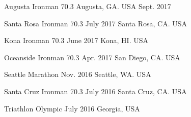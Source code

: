 

\begin{ironmans}

  \cvhonor
    {Augusta Ironman 70.3} %
    {  } %
    {Augusta, GA. USA} %
    {Sept. 2017} %
    
  \cvhonor
    { } %
    {Santa Rosa Ironman 70.3} %
    {July 2017} %
    {Santa Rosa, CA. USA} %

  \cvhonor
    {Kona Ironman 70.3} %
    { } %
    {June 2017} %
    {Kona, HI. USA} %

  \cvhonor
    {Oceanside Ironman 70.3} %
    { } %
    {Apr. 2017} %
    {San Diego, CA. USA} %

  \cvhonor
    {Seattle Marathon} %
    { } %
    {Nov. 2016} %
    {Seattle, WA. USA} %

  \cvhonor
    {Santa Cruz Ironman 70.3} %
    { } %
    {July 2016} %
    {Santa Cruz, CA. USA} %

  \cvhonor
    {Triathlon Olympic} %
    { }
    {July 2016} %
    {Georgia, USA} %

\end{ironmans}
